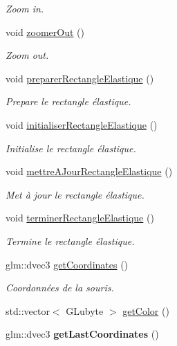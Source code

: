 \begin{DoxyCompactItemize}
\begin{DoxyCompactList}\small\item\em Zoom in. \end{DoxyCompactList}\item 
void \hyperlink{group__inf2990_gaa2e1aeaa2fd10b16cf8b5f406d6270c8}{zoomer\-Out} ()
\begin{DoxyCompactList}\small\item\em Zoom out. \end{DoxyCompactList}\item 
void \hyperlink{group__inf2990_gaa5ea001f334158926e6c701478926ae9}{preparer\-Rectangle\-Elastique} ()
\begin{DoxyCompactList}\small\item\em Prepare le rectangle élastique. \end{DoxyCompactList}\item 
void \hyperlink{group__inf2990_ga6ccf25bd92d3bae6dfeebaf051c768f4}{initialiser\-Rectangle\-Elastique} ()
\begin{DoxyCompactList}\small\item\em Initialise le rectangle élastique. \end{DoxyCompactList}\item 
void \hyperlink{group__inf2990_ga382ae0540038d9ef65673af9d5d1b164}{mettre\-A\-Jour\-Rectangle\-Elastique} ()
\begin{DoxyCompactList}\small\item\em Met à jour le rectangle élastique. \end{DoxyCompactList}\item 
void \hyperlink{group__inf2990_ga1c99d4d88f05b70a20b36b51c07f31cf}{terminer\-Rectangle\-Elastique} ()
\begin{DoxyCompactList}\small\item\em Termine le rectangle élastique. \end{DoxyCompactList}\item 
glm\-::dvec3 \hyperlink{group__inf2990_ga4c28397e45d882d3d982ed68978e9e20}{get\-Coordinates} ()
\begin{DoxyCompactList}\small\item\em Coordonnées de la souris. \end{DoxyCompactList}\item 
std\-::vector$<$ G\-Lubyte $>$ \hyperlink{group__inf2990_gaed1bb083cd47a1a5204c626f340e718f}{get\-Color} ()
\item 
\hypertarget{class_facade_modele_a75ed82ecf9c7da0462ce458a373c1df9}{glm\-::dvec3 {\bfseries get\-Last\-Coordinates} ()}\label{class_facade_modele_a75ed82ecf9c7da0462ce458a373c1df9}


\end{DoxyCompactItemize}
